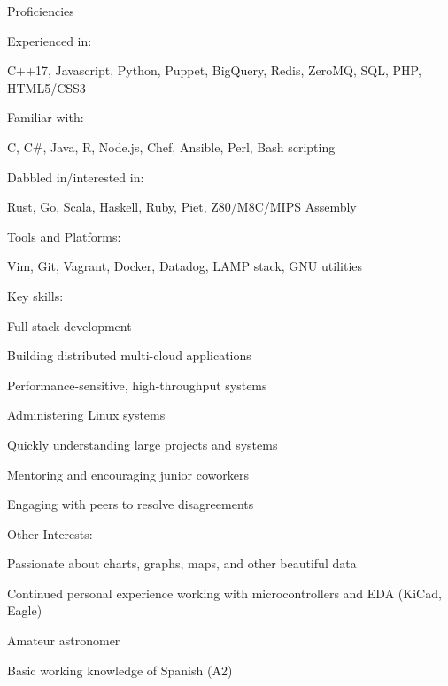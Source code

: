 \documentclass[letterpaper,12pt]{article}
\begin{document}
\begin{paracol}{2}
\vspace{2em}
\begin{rsection}{Proficiencies}
  \begin{rpara}{Experienced in:}%
    \raggedright
    C++17, Javascript, Python, Puppet, BigQuery, Redis, ZeroMQ, SQL, PHP, HTML5/CSS3
  \end{rpara}
  \begin{rpara}{Familiar with:}%
    \raggedright
    C, C\#, Java, R, Node.js, Chef, Ansible, Perl, Bash scripting
  \end{rpara}
  \begin{rpara}{Dabbled in/interested in:}%
    \raggedright
    Rust, Go, Scala, Haskell, Ruby, Piet, Z80/M8C/MIPS Assembly
  \end{rpara}

  \begin{rpara}{Tools and Platforms:}%
    \raggedright
    Vim, Git, Vagrant, Docker, Datadog, LAMP stack, GNU utilities
  \end{rpara}
  \newpage
  \begin{rsubitems}[
    leftmargin=1.5em,
    itemindent=0em,
    labelwidth=1.5em
  ]{Key skills:}
    \item Full-stack development
    \item Building distributed multi-cloud applications
    \item Performance-sensitive, high-throughput systems
    \item Administering Linux systems
    \item Quickly understanding large projects and systems
    \item Mentoring and encouraging junior coworkers
    \item Engaging with peers to resolve disagreements
  \end{rsubitems}
  \begin{rsubitems}[
    leftmargin=1.5em,
    itemindent=0em,
    labelwidth=1.5em
  ]{Other Interests:}
    \item Passionate about charts, graphs, maps, and other beautiful data\\
    \item Continued personal experience working with microcontrollers and EDA (KiCad, Eagle)
    \item Amateur astronomer
    \item Basic working knowledge of Spanish (A2)
  \end{rsubitems}
\end{rsection}


\end{paracol}
\end{document}
